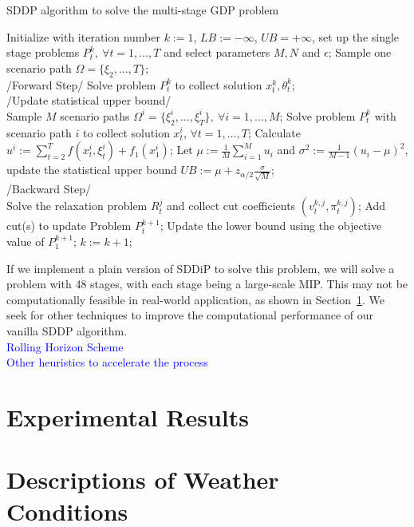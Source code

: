 \documentclass[12pt]{article}
\begin{document}
	\begin{algorithm}[H]
		\caption{SDDP algorithm to solve the multi-stage GDP problem}
		\label{alg:SDDP}
		\begin{algorithmic}[1]
			\State Initialize with iteration number \(k := 1\), \(LB := -\infty\), \(UB = +\infty\), set up the single stage problems \(P_t^k,\ \forall t = 1, \dots, T\) and select parameters \(M, N\) and \(\epsilon\);
			\State Sample one scenario path \(\Omega = \{\xi_2, \dots, T\}\); \\
			\State /Forward Step/
			\State Solve problem \(P_t^k\) to collect solution \(x_t^k, \theta_t^k\);
			\EndFor\\
			\State /Update statistical upper bound/\\
			\State Sample \(M\) scenario paths \(\Omega^i = \{\xi^i_2, \dots, \xi^i_T\}, \ \forall i = 1, \dots, M\);
			\State Solve problem \(P_t^k\) with scenario path \(i\) to collect solution \(x_t^i\), \(\forall t = 1, \dots, T\);
			\State Calculate \(u^i := \sum_{t = 2}^{T} f(x_t^i, \xi_t^i) + f_1(x_1^i)\);
			\EndFor
			\State Let \(\mu := \frac{1}{M} \sum_{i = 1}^{M} u_i\) and \(\sigma^2 := \frac{1}{M-1} (u_i - \mu)^2\), update the statistical upper bound \(UB := \mu + z_{\alpha/2}\frac{\sigma}{\sqrt{M}}\);
			\EndIf\\
			\State /Backward Step/\\
			\State Solve the relaxation problem \(R_t^j\) and collect cut coefficients \((v_t^{k,j}, \pi_t^{k,j})\);
			\EndFor
			\State Add cut(s) to update Problem \(P_t^{k+1}\);
			\EndFor
			\State Update the lower bound using the objective value of \(P_1^{k+1}\);
			\State \(k := k + 1\);
			\EndWhile
		\end{algorithmic}
	\end{algorithm}
	\noindent If we implement a plain version of SDDiP to solve this problem, we will solve a problem with 48 stages, with each stage being a large-scale MIP. This may not be computationally feasible in real-world application, as shown in Section~\ref{expResults}. We seek for other techniques to improve the computational performance of our vanilla SDDP algorithm.\\
	\newline
	\textcolor{blue}{Rolling Horizon Scheme}\\
	\textcolor{blue}{Other heuristics to accelerate the process}
\section{Experimental Results}\label{expResults}

\appendix
\gdef\thesection{Appendix \Alph{section}}
	\section{Descriptions of Weather Conditions}
	\label{app:weatherCond}

\nocite{*}


\end{document}
